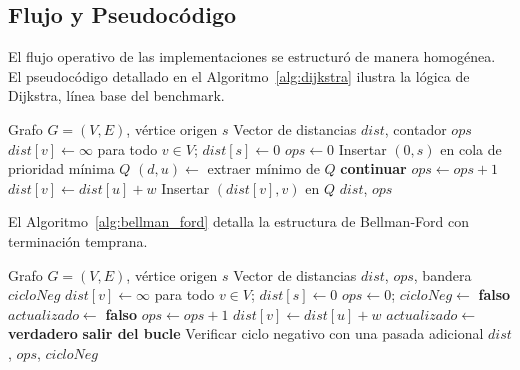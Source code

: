 \documentclass[conference]{IEEEtran}
\begin{document}
\subsection{Flujo y Pseudocódigo}

El flujo operativo de las implementaciones se estructuró de manera homogénea. El pseudocódigo detallado en el Algoritmo~\ref{alg:dijkstra} ilustra la lógica de Dijkstra, línea base del benchmark.

\begin{algorithm}[H]
\caption{Dijkstra con eliminación perezosa.}
\label{alg:dijkstra}
\begin{algorithmic}[1]
\Require Grafo $G=(V,E)$, vértice origen $s$
\Ensure Vector de distancias $dist$, contador $ops$
\State $dist[v] \gets \infty$ para todo $v \in V$; \; $dist[s] \gets 0$
\State $ops \gets 0$
\State Insertar $(0, s)$ en cola de prioridad mínima $Q$
    \State $(d, u) \gets$ extraer mínimo de $Q$
     \textbf{continuar} \EndIf
        \State $ops \gets ops + 1$
            \State $dist[v] \gets dist[u] + w$
            \State Insertar $(dist[v], v)$ en $Q$
        \EndIf
    \EndFor
\EndWhile
\State \Return $dist$, $ops$
\end{algorithmic}
\end{algorithm}

El Algoritmo~\ref{alg:bellman_ford} detalla la estructura de Bellman-Ford con terminación temprana.

\begin{algorithm}[H]
\caption{Bellman-Ford con terminación temprana.}
\label{alg:bellman_ford}
\begin{algorithmic}[1]
\Require Grafo $G=(V,E)$, vértice origen $s$
\Ensure Vector de distancias $dist$, $ops$, bandera $cicloNeg$
\State $dist[v] \gets \infty$ para todo $v \in V$; \; $dist[s] \gets 0$
\State $ops \gets 0$; \; $cicloNeg \gets$ \textbf{falso}
    \State $actualizado \gets$ \textbf{falso}
            \State $ops \gets ops + 1$
                \State $dist[v] \gets dist[u] + w$
                \State $actualizado \gets$ \textbf{verdadero}
            \EndIf
        \EndFor
    \EndFor
     \textbf{salir del bucle} \EndIf
\EndFor
\State Verificar ciclo negativo con una pasada adicional
\State \Return $dist$, $ops$, $cicloNeg$
\end{algorithmic}
\end{algorithm}
\end{document}
